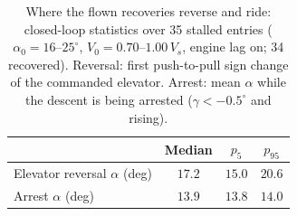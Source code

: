 \begin{table}[H]
    \centering
    \caption{Where the flown recoveries reverse and ride: closed-loop
    statistics over 35 stalled entries
    ($\alpha_0 = 16$--$25^\circ$, $V_0 = 0.70$--$1.00\,V_s$, engine
    lag on; 34 recovered). Reversal: first push-to-pull sign
    change of the commanded elevator. Arrest: mean $\alpha$ while the
    descent is being arrested ($\gamma < -0.5^\circ$ and rising).}
    \label{tab:closed_loop_alpha}
    \begin{tabular}{l c c c}
        \toprule
         & Median & $p_5$ & $p_{95}$ \\
        \midrule
        Elevator reversal $\alpha$ (deg) & $17.2$ & $15.0$ & $20.6$ \\
        Arrest $\alpha$ (deg) & $13.9$ & $13.8$ & $14.0$ \\
        \bottomrule
    \end{tabular}
\end{table}

